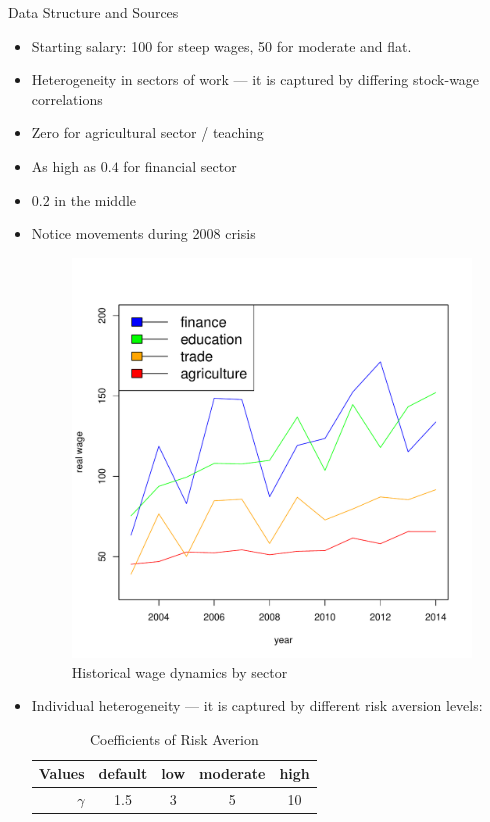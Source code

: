 \documentclass{beamer}
\begin{document}
\begin{frame}[allowframebreaks]{Data Structure and Sources}
\begin{itemize}
	\item Starting salary: 100 for steep wages, 50 for moderate and flat.

	\framebreak

	\item Heterogeneity in sectors of work --- it is captured by differing stock-wage correlations
	\item Zero for agricultural sector / teaching
	\item As high as $0.4$ for financial sector
	\item $0.2$ in the middle
	\item Notice movements during 2008 crisis

\begin{figure}[h]
	\centering
	\includegraphics[scale=0.3]{figs/wage2sec.pdf}
	\caption{Historical wage dynamics by sector}
\end{figure}

\framebreak

	\item Individual heterogeneity --- it is captured by different risk aversion levels:

\begin{table}
	\centering
	\caption{Coefficients of Risk Averion}
	\begin{tabular}[c]{r|cccc}
		Values&default&low&moderate&high\\
		\hline
		$\gamma$&1.5&3&5&10\\
	\end{tabular}
\end{table}
	

\end{itemize}
\end{frame}
\end{document}
